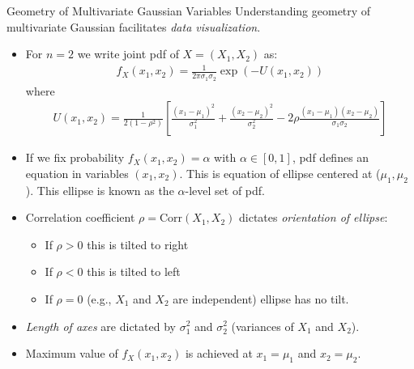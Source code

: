\documentclass[handout,9pt]{beamer}
\begin{document}
%
\begin{frame}{Geometry of Multivariate Gaussian Variables}
Understanding geometry of multivariate Gaussian facilitates {\em data visualization}.  

\begin{itemize}
\setlength{\itemsep}{5pt}
\item For $n=2$ we write joint pdf of $X=(X_1,X_2)$ as:
\begin{align*}
f_X(x_1,x_2)=\frac{1}{2\pi\sigma_1\sigma_2}\exp\left(-U(x_1,x_2)\right)
\end{align*}
where 
\begin{align*}
U(x_1,x_2)=\frac{1}{2(1-\rho^2)}\left[\frac{(x_1-\mu_1)^2}{\sigma_1^2}+\frac{(x_2-\mu_2)^2}{\sigma_2^2}-2\rho\frac{(x_1-\mu_1)(x_2-\mu_2)}{\sigma_1\sigma_2}\right]
\end{align*}

\item If we fix probability $f_X(x_1,x_2)=\alpha$ with $\alpha\in [0,1]$, pdf defines an equation in variables $(x_1,x_2)$.  This is equation of ellipse centered at ($\mu_1,\mu_2$).  This ellipse is known as the $\alpha$-level set of pdf.  

\item Correlation coefficient $\rho=\textrm{Corr}(X_1,X_2)$ dictates {\em orientation of ellipse}: 
\begin{itemize}
\item If $\rho>0$ this is tilted to right
\item If $\rho<0$ this is tilted to  left
\item If $\rho=0$ (e.g., $X_1$ and $X_2$ are independent) ellipse has no tilt. 
\end{itemize}
\item {\em Length of axes} are dictated by $\sigma_1^2$ and $\sigma_2^2$ (variances of $X_1$ and $X_2$).

\item Maximum value of $f_X(x_1,x_2)$ is achieved at $x_1=\mu_1$ and $x_2=\mu_2$. 

\end{itemize}

\end{frame}
\end{document}
